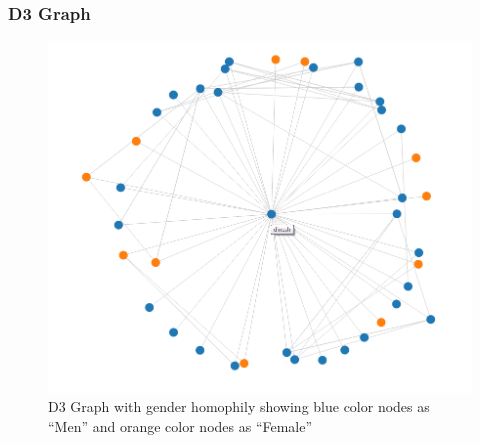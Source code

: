 \subsubsection{D3 Graph}
\begin{figure}[ht]    
    \begin{center}
        \includegraphics[scale=0.8]{gender_homophily.png}
        \caption{D3 Graph with gender homophily showing blue color nodes as ``Men'' and orange color nodes as ``Female'' }
        \label{graph2}
    \end{center}
\end{figure}
\newpage
